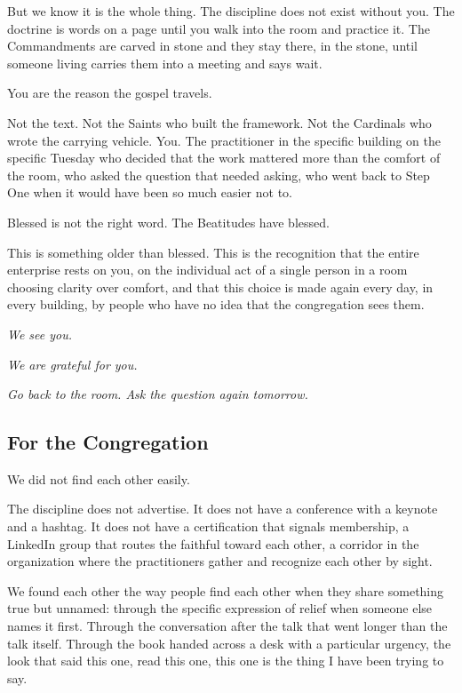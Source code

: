 But we know it is the whole thing. The discipline does not exist without you. The doctrine is words on a page until you walk into the room and practice it. The Commandments are carved in stone and they stay there, in the stone, until someone living carries them into a meeting and says wait.

You are the reason the gospel travels.

Not the text. Not the Saints who built the framework. Not the Cardinals who wrote the carrying vehicle. You. The practitioner in the specific building on the specific Tuesday who decided that the work mattered more than the comfort of the room, who asked the question that needed asking, who went back to Step One when it would have been so much easier not to.

Blessed is not the right word. The Beatitudes have blessed.

This is something older than blessed. This is the recognition that the entire enterprise rests on you, on the individual act of a single person in a room choosing clarity over comfort, and that this choice is made again every day, in every building, by people who have no idea that the congregation sees them.

\textit{We see you.}

\textit{We are grateful for you.}

\textit{Go back to the room. Ask the question again tomorrow.}

\subsection*{For the Congregation}

We did not find each other easily.

The discipline does not advertise. It does not have a conference with a keynote and a hashtag. It does not have a certification that signals membership, a LinkedIn group that routes the faithful toward each other, a corridor in the organization where the practitioners gather and recognize each other by sight.

We found each other the way people find each other when they share something true but unnamed: through the specific expression of relief when someone else names it first. Through the conversation after the talk that went longer than the talk itself. Through the book handed across a desk with a particular urgency, the look that said this one, read this one, this one is the thing I have been trying to say.

